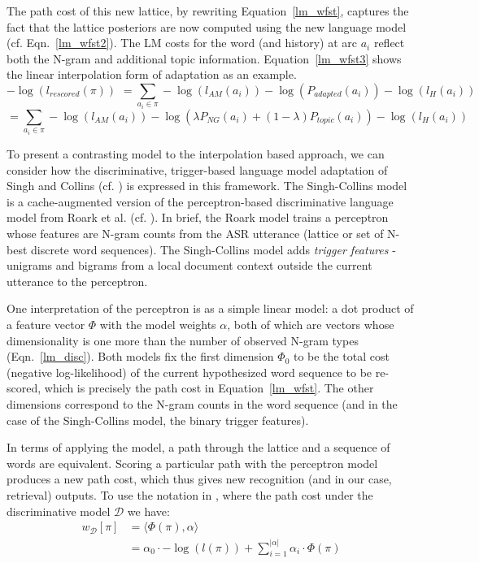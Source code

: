 \noindent The path cost of this new lattice, by rewriting Equation~\ref{lm_wfst}, captures the fact that the lattice posteriors are now computed using the new language model (cf. Eqn.~\ref{lm_wfst2}).  The LM costs for the word (and history) at arc $a_i$ reflect both the N-gram and additional topic information.   Equation~\ref{lm_wfst3} shows the linear interpolation form of adaptation as an example.
\begin{equation}
-\log(l_{rescored}(\pi)) \,\, = \sum_{a_i \in \pi} -\log(l_{AM}(a_i)) - \log(P_{adapted}(a_i)) - \log(l_{H}(a_i)) \,\,\,\,\,\,\, \label{lm_wfst2}
\end{equation}
\begin{equation}
= \sum_{a_i \in \pi} -\log(l_{AM}(a_i)) - \log\left(\lambda P_{NG}(a_i) + (1-\lambda)P_{topic}(a_i) \right) - \log(l_{H}(a_i)) \label{lm_wfst3} 
\end{equation}
\vskip0.5cm

To present a contrasting model to the interpolation based approach, we can consider how the discriminative, trigger-based language model adaptation of Singh and Collins (cf. \cite{singh2007trigger}) is expressed in this framework.  The Singh-Collins model is a cache-augmented version of the perceptron-based discriminative language model from Roark et al. (cf. \cite{roark2004discriminative}).   In brief, the Roark model trains a perceptron whose features are N-gram counts from the ASR utterance (lattice or set of N-best discrete word sequences).  The Singh-Collins model adds \textit{trigger features} - unigrams and bigrams from a local document context outside the current utterance to the perceptron.

One interpretation of the perceptron is as a simple linear model: a dot product of a feature vector $\Phi$ with the model weights $\alpha$, both of which are vectors whose dimensionality is one more than the number of observed N-gram types (Eqn.~\ref{lm_disc}).  Both models fix the first dimension $\Phi_0$ to be the total cost (negative log-likelihood) of the current hypothesized word sequence to be re-scored, which is precisely the path cost in Equation~\ref{lm_wfst}.  The other dimensions correspond to the N-gram counts in the word sequence (and in the case of the Singh-Collins model, the binary trigger features).

In terms of applying the model, a path through the lattice and a sequence of words are equivalent. Scoring a particular path with the perceptron model produces a new path cost, which thus gives new recognition (and in our case, retrieval) outputs.  To use the notation in \cite{roark2004discriminative}, where the path cost under the discriminative model $\mathcal{D}$ we have:
\begin{align}
w_{\mathcal{D}}[\pi] &= \langle \Phi(\pi), \alpha\rangle \label{lm_disc} \\
	&= \alpha_0\cdot-\log(l(\pi)) + \sum_{i=1}^{|\alpha|}\alpha_i\cdot\Phi(\pi) 
\end{align}

